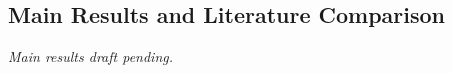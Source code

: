 \subsection{Main Results and Literature Comparison}
\label{sec:main-results}
\textit{Main results draft pending.}
